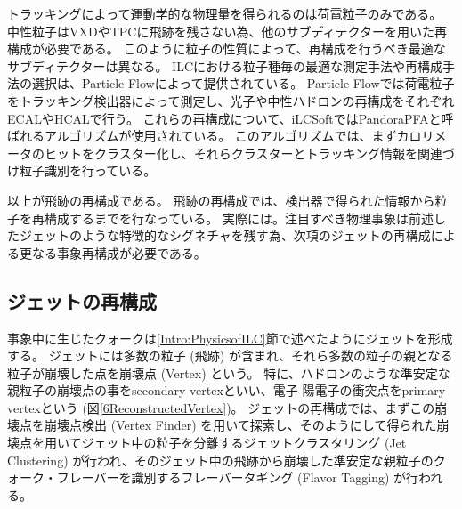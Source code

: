 トラッキングによって運動学的な物理量を得られるのは荷電粒子のみである。
中性粒子はVXDやTPCに飛跡を残さない為、他のサブディテクターを用いた再構成が必要である。
このように粒子の性質によって、再構成を行うべき最適なサブディテクターは異なる。
ILCにおける粒子種毎の最適な測定手法や再構成手法の選択は、Particle Flowによって提供されている。
Particle Flowでは荷電粒子をトラッキング検出器によって測定し、光子や中性ハドロンの再構成をそれぞれECALやHCALで行う。
これらの再構成について、iLCSoftではPandoraPFAと呼ばれるアルゴリズムが使用されている。
このアルゴリズムでは、まずカロリメータのヒットをクラスター化し、それらクラスターとトラッキング情報を関連づけ粒子識別を行っている。

以上が飛跡の再構成である。
飛跡の再構成では、検出器で得られた情報から粒子を再構成するまでを行なっている。
実際には。注目すべき物理事象は前述したジェットのような特徴的なシグネチャを残す為、次項のジェットの再構成による更なる事象再構成が必要である。


\subsection{ジェットの再構成} \label{Intro:SoftERILC:JetReconstruction}

事象中に生じたクォークは\ref{Intro:PhysicsofILC}節で述べたようにジェットを形成する。
ジェットには多数の粒子 (飛跡) が含まれ、それら多数の粒子の親となる粒子が崩壊した点を崩壊点 (Vertex) という。
特に、ハドロンのような準安定な親粒子の崩壊点の事をsecondary vertexといい、電子-陽電子の衝突点をprimary vertexという (図\ref{6ReconstructedVertex})。
ジェットの再構成では、まずこの崩壊点を崩壊点検出 (Vertex Finder) を用いて探索し、そのようにして得られた崩壊点を用いてジェット中の粒子を分離するジェットクラスタリング (Jet Clustering) が行われ、そのジェット中の飛跡から崩壊した準安定な親粒子のクォーク・フレーバーを識別するフレーバータギング (Flavor Tagging) が行われる。

